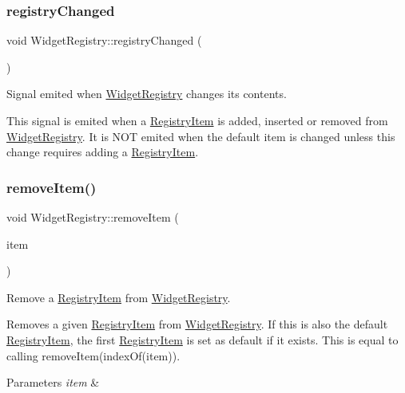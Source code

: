 \subsubsection{\texorpdfstring{registry\+Changed}{registryChanged}}
{\footnotesize\ttfamily void Widget\+Registry\+::registry\+Changed (\begin{DoxyParamCaption}{ }\end{DoxyParamCaption})\hspace{0.3cm}{\ttfamily [signal]}}



Signal emited when \hyperlink{class_widget_registry}{Widget\+Registry} changes its contents. 

This signal is emited when a \hyperlink{class_registry_item}{Registry\+Item} is added, inserted or removed from \hyperlink{class_widget_registry}{Widget\+Registry}. It is N\+OT emited when the default item is changed unless this change requires adding a \hyperlink{class_registry_item}{Registry\+Item}. \hypertarget{class_widget_registry_a076561002958c840a9096d27cdbfdeed}{}\label{class_widget_registry_a076561002958c840a9096d27cdbfdeed} 
\subsubsection{\texorpdfstring{remove\+Item()}{removeItem()}\hspace{0.1cm}{\footnotesize\ttfamily [1/2]}}
{\footnotesize\ttfamily void Widget\+Registry\+::remove\+Item (\begin{DoxyParamCaption}\item[{\hyperlink{class_registry_item}{Registry\+Item} $\ast$}]{item }\end{DoxyParamCaption})}



Remove a \hyperlink{class_registry_item}{Registry\+Item} from \hyperlink{class_widget_registry}{Widget\+Registry}. 

Removes a given \hyperlink{class_registry_item}{Registry\+Item} from \hyperlink{class_widget_registry}{Widget\+Registry}. If this is also the default \hyperlink{class_registry_item}{Registry\+Item}, the first \hyperlink{class_registry_item}{Registry\+Item} is set as default if it exists. This is equal to calling remove\+Item(index\+Of(item)). 
\begin{DoxyParams}{Parameters}
{\em item} & \\
\hline
\end{DoxyParams}
\hypertarget{class_widget_registry_a96abefe3fed38e9424609cc3cf2f8d7d}{}\label{class_widget_registry_a96abefe3fed38e9424609cc3cf2f8d7d} 
